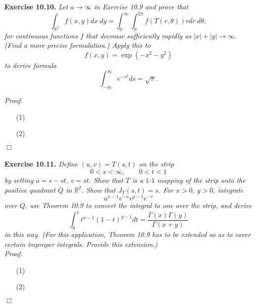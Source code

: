 \documentclass{article}
\begin{document}



\textbf{Exercise 10.10.}
\emph{Let $a \to \infty$ in Exercise 10.9 and prove that
\[
  \int_{\mathbb{R}^2} f(x,y) dx \: dy
  = \int_{0}^{\infty} \int_{0}^{2\pi} f(T(r,\theta))r dr \: d\theta,
\]
for continuous functions $f$ that decrease sufficiently rapidly
as $|x|+|y| \to \infty$.
(Find a more precise formulation.)
Apply this to
\[
  f(x,y) = \exp(-x^2-y^2)
\]
to derive formula}
\[
  \int_{-\infty}^{\infty} e^{-s^2} ds = \sqrt{\pi}.
\]



\emph{Proof.}
\begin{enumerate}
\item[(1)]
\item[(2)]

\end{enumerate}
$\Box$ \\\\






\textbf{Exercise 10.11.}
\emph{Define $(u,v)=T(s,t)$ on the strip
\[
  0 < s < \infty,
  \qquad
  0 < t < 1
\]
by setting $u=s-st$, $v=st$.
Show that $T$ is a $1$-$1$ mapping of the strip onto the positive quadrant $Q$ in $\mathbb{R}^2$.
Show that $J_T(s,t) = s$.
For $x > 0$, $y > 0$, integrate
\[
  u^{x-1} e^{-u} v^{y-1} e^{-v}
\]
over $Q$, use Theorem 10.9 to convert the integral to one over the strip,
and derive
\[
  \int_{0}^{1} t^{x-1}(1-t)^{y-1} dt = \frac{\Gamma(x)\Gamma(y)}{\Gamma(x+y)}
\]
in this way.
(For this application,
Theorem 10.9 has to be extended so as to cover certain improper integrals.
Provide this extension.)} \\



\emph{Proof.}
\begin{enumerate}
\item[(1)]
\item[(2)]

\end{enumerate}
$\Box$ \\\\



\end{document}
